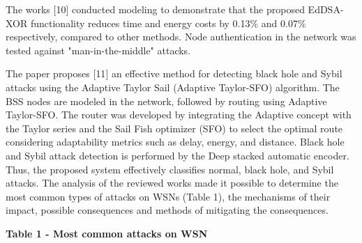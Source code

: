 The works {[}10{]} conducted modeling to demonstrate that the proposed
EdDSA-XOR functionality reduces time and energy costs by 0.13\% and
0.07\% respectively, compared to other methods. Node authentication in
the network was tested against "man-in-the-middle" attacks.

The paper proposes {[}11{]} an effective method for detecting black hole
and Sybil attacks using the Adaptive Taylor Sail (Adaptive Taylor-SFO)
algorithm. The BSS nodes are modeled in the network, followed by routing
using Adaptive Taylor-SFO. The router was developed by integrating the
Adaptive concept with the Taylor series and the Sail Fish optimizer
(SFO) to select the optimal route considering adaptability metrics such
as delay, energy, and distance. Black hole and Sybil attack detection is
performed by the Deep stacked automatic encoder. Thus, the proposed
system effectively classifies normal, black hole, and Sybil attacks. The
analysis of the reviewed works made it possible to determine the most
common types of attacks on WSNs (Table 1), the mechanisms of their
impact, possible consequences and methods of mitigating the
consequences.

{\bfseries Table 1 - Most common attacks on WSN}

